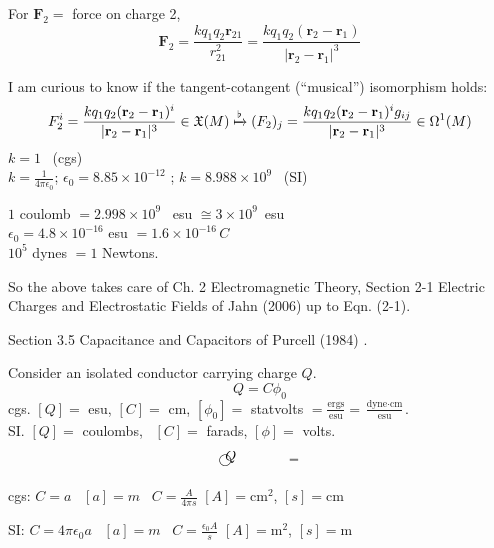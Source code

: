 \documentclass[10pt]{amsart}
\begin{document}
\begin{multicols*}{2}
For $\mathbf{F}_2 = $ force on charge 2,
\[
\mathbf{F}_2 = \frac{k q_1 q_2 \mathbf{r}_{21} }{ r_{21}^2 } = \frac{k q_1 q_2 (\mathbf{r}_2 - \mathbf{r}_1 ) }{ | \mathbf{r}_2 - \mathbf{r}_1 |^3}
\]

I am curious to know if the tangent-cotangent (``musical'') isomorphism holds:
\[
F_2^i = \frac{ kq_1 q_2 (\mathbf{r}_2 - \mathbf{r}_1)^i }{ |\mathbf{r}_2 - \mathbf{r}_1 |^3 } \in \mathfrak{X}(M) \xmapsto{ \flat } (F_2)_j = \frac{k q_1 q_2 (\mathbf{r}_2 - \mathbf{r}_1)^i g_{ij} }{ | \mathbf{r}_2 - \mathbf{r}_1 |^3 } \in \Omega^1(M)
\]
$k=1$ \, (cgs) \\
$k = \frac{1}{4\pi \epsilon_0}$; $\epsilon_0 = 8.85 \times 10^{-12}$ ; $k = 8.988 \times 10^9$ \, (SI)

$1$ coulomb $=  2.998 \times 10^9 $ \, esu $\cong 3 \times 10^9 \, $ esu \\
$\epsilon_0 = 4.8 \times 10^{-16}$ esu $ = 1.6 \times 10^{-16} \, C$ \\
$10^5$ dynes $=1 $ Newtons.  

So the above takes care of Ch. 2 Electromagnetic Theory, Section 2-1 Electric Charges and Electrostatic Fields of Jahn (2006) \cite{Jahn2006} up to Eqn. (2-1).  


Section 3.5 Capacitance and Capacitors of Purcell (1984) \cite{Purcell1984}.

Consider an isolated conductor carrying charge $Q$.
\[
Q = C\phi_0
\]
cgs.  $[Q] = $ esu, $[C] = $ cm, $[\phi_0] = $ statvolts $= \frac{ \text{ergs}}{\text{esu}} = \frac{ \text{dyne}\cdot \text{cm}}{ \text{esu} }$.  \\
SI. $[Q]=$ coulombs, \, $[C] = $ farads, $[\phi] = $ volts.  


\[
\begin{gathered}
\begin{picture}(8,5)(0,0)
  \put(4,4){\circle{7.5}}
  \put(4,4){$Q$}
\end{picture}
\qquad \qquad \,
\begin{picture}(8,5)(0,0)
  \put(.7,4.7){\line(1,0){6}}
  \put(.7,4.0){\line(1,0){6}}
  \end{picture}
\end{gathered}
\]

cgs: $C=a$ \, $[a] = m$ \qquad \, $ C = \frac{A}{4\pi s}$ $[A] = \text{cm}^2$, $[s] = \text{cm}$

SI: $C=4\pi \epsilon_0 a$  \, $[a] = m$ \qquad \, $ C = \frac{\epsilon_0 A}{ s}$ $[A] = \text{m}^2$, $[s] = \text{m}$


\end{multicols*}
\end{document}
